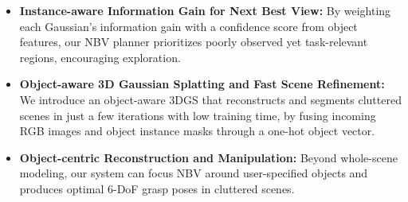 \begin{itemize}
    \item \textbf{Instance-aware Information Gain for Next Best View: }
    By weighting each Gaussian’s information gain with a confidence score from object features, our \ac{NBV} planner prioritizes poorly observed yet task-relevant regions, encouraging exploration.
    \item \textbf{Object-aware 3D Gaussian Splatting and Fast Scene Refinement: } 
    We introduce an object-aware \ac{3DGS} that reconstructs and segments cluttered scenes in just a few iterations with low training time, by fusing incoming RGB images and object instance masks through a one-hot object vector.
    \item \textbf{Object-centric Reconstruction and Manipulation: }
    Beyond whole-scene modeling, our system can focus \ac{NBV} around user-specified objects and produces optimal 6-DoF grasp poses in cluttered scenes.
\end{itemize}

